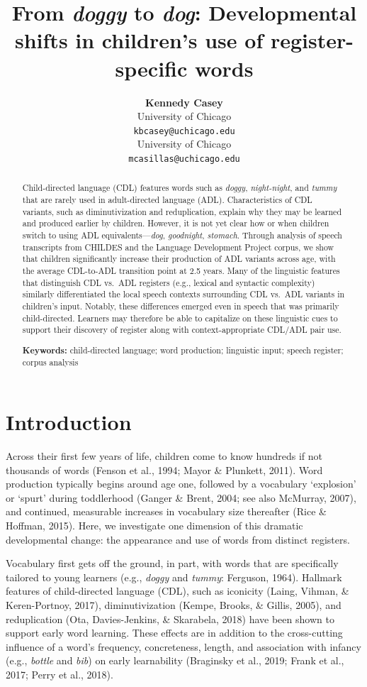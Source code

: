 \documentclass[10pt, letterpaper]{article}
\title{From \emph{doggy} to \emph{dog}: Developmental shifts in
children's use of register-specific words}
\author{{\large \bf Kennedy Casey} \\ University of Chicago \\ \texttt{kbcasey@uchicago.edu} \And {\large \bf Marisa Casillas} \\ University of Chicago \\ \texttt{mcasillas@uchicago.edu}}
\begin{document}
\maketitle

\begin{abstract}
Child-directed language (CDL) features words such as \emph{doggy},
\emph{night-night}, and \emph{tummy} that are rarely used in
adult-directed language (ADL). Characteristics of CDL variants, such as
diminutivization and reduplication, explain why they may be learned and
produced earlier by children. However, it is not yet clear how or when
children switch to using ADL equivalents---\emph{dog}, \emph{goodnight},
\emph{stomach}. Through analysis of speech transcripts from CHILDES and
the Language Development Project corpus, we show that children
significantly increase their production of ADL variants across age, with
the average CDL-to-ADL transition point at 2.5 years. Many of the
linguistic features that distinguish CDL vs.~ADL registers (e.g.,
lexical and syntactic complexity) similarly differentiated the local
speech contexts surrounding CDL vs.~ADL variants in children's input.
Notably, these differences emerged even in speech that was primarily
child-directed. Learners may therefore be able to capitalize on these
linguistic cues to support their discovery of register along with
context-appropriate CDL/ADL pair use.

\textbf{Keywords:}
child-directed language; word production; linguistic input; speech
register; corpus analysis
\end{abstract}

\hypertarget{introduction}{%
\section{Introduction}\label{introduction}}

Across their first few years of life, children come to know hundreds if
not thousands of words (Fenson et al., 1994; Mayor \& Plunkett, 2011).
Word production typically begins around age one, followed by a
vocabulary `explosion' or `spurt' during toddlerhood (Ganger \& Brent,
2004; see also McMurray, 2007), and continued, measurable increases in
vocabulary size thereafter (Rice \& Hoffman, 2015). Here, we investigate
one dimension of this dramatic developmental change: the appearance and
use of words from distinct registers.

Vocabulary first gets off the ground, in part, with words that are
specifically tailored to young learners (e.g., \emph{doggy} and
\emph{tummy}: Ferguson, 1964). Hallmark features of child-directed
language (CDL), such as iconicity (Laing, Vihman, \& Keren-Portnoy,
2017), diminutivization (Kempe, Brooks, \& Gillis, 2005), and
reduplication (Ota, Davies-Jenkins, \& Skarabela, 2018) have been shown
to support early word learning. These effects are in addition to the
cross-cutting influence of a word's frequency, concreteness, length, and
association with infancy (e.g., \emph{bottle} and \emph{bib}) on early
learnability (Braginsky et al., 2019; Frank et al., 2017; Perry et al.,
2018).
\end{document}
